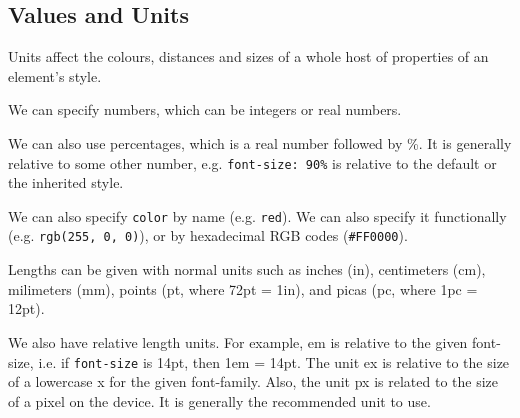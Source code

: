 \documentclass[a4paper, openany]{memoir}
\begin{document}
\subsection{Values and Units}
Units affect the colours, distances and sizes of a whole host of properties of an element's style. 

We can specify numbers, which can be integers or real numbers. 

We can also use percentages, which is a real number followed by \%. It is generally relative to some other number, e.g. \texttt{font-size: 90\%} is relative to the default or the inherited style. 

We can also specify \texttt{color} by name (e.g. \texttt{red}). We can also specify it functionally (e.g. \texttt{rgb(255, 0, 0)}), or by hexadecimal RGB codes (\texttt{\#FF0000}).

Lengths can be given with normal units such as inches (in), centimeters (cm), milimeters (mm), points (pt, where 72pt = 1in), and picas (pc, where 1pc = 12pt).

We also have relative length units. For example, em is relative to the given font-size, i.e. if \texttt{font-size} is 14pt, then 1em = 14pt. The unit ex is relative to the size of a lowercase x for the given font-family. Also, the unit px is related to the size of a pixel on the device. It is generally the recommended unit to use.
\end{document}
